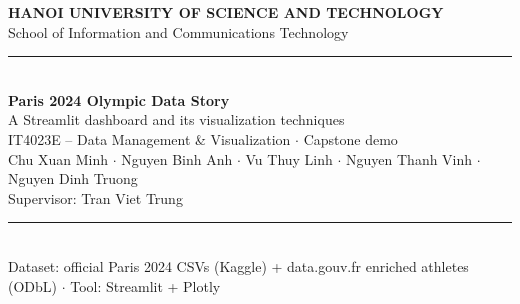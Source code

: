 \documentclass[aspectratio=169,11pt]{beamer}
\begin{document}
\begin{frame}[plain]
  \vfill
  \begin{center}
    {\small\bfseries\color{charcoal} HANOI UNIVERSITY OF SCIENCE AND TECHNOLOGY}\\[2pt]
    {\footnotesize\color{slate} School of Information and Communications Technology}\\[10pt]
    {\color{gold}\rule{0.86\paperwidth}{2pt}}\\[10pt]
    {\Huge\bfseries\color{charcoal} Paris 2024 Olympic Data Story}\\[8pt]
    {\large\color{teal} A Streamlit dashboard and its visualization techniques}\\[6pt]
    {\color{slate} IT4023E -- Data Management \& Visualization $\cdot$ Capstone demo}\\[8pt]
    {\footnotesize\color{slate} Chu Xuan Minh $\cdot$ Nguyen Binh Anh $\cdot$ Vu Thuy Linh
    $\cdot$ Nguyen Thanh Vinh $\cdot$ Nguyen Dinh Truong}\\[3pt]
    {\footnotesize\color{slate} Supervisor: Tran Viet Trung}\\[10pt]
    {\color{gold}\rule{0.86\paperwidth}{2pt}}\\[14pt]
    {\footnotesize\color{slate} Dataset: official Paris 2024 CSVs (Kaggle) + data.gouv.fr enriched athletes (ODbL)
    $\cdot$ Tool: Streamlit + Plotly}
  \end{center}
  \vfill
\end{frame}
\end{document}
